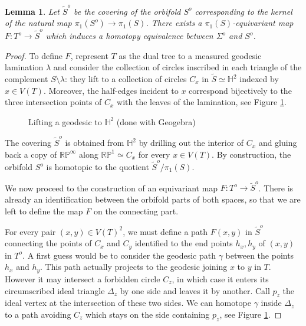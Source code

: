 \documentclass[10pt,a4paper]{amsart}
\newtheorem{lemma}{Lemma}
\renewcommand{\H}{\mathbb{H}}
\renewcommand{\P}{\mathbb{P}}
\newcommand{\R}{\mathbb{R}}
\begin{document}
\begin{lemma}\label{equiv-homotopy}
Let $\tilde{S}^o$ be the covering of the orbifold $S^o$ corresponding to the kernel of the natural map $\pi_1(S^o)\to \pi_1(S)$. There exists a $\pi_1(S)$-equivariant map $F:T^o\to \tilde{S}^o$ which induces a homotopy equivalence between $\Sigma^o$ and $S^o$.
\end{lemma}

\begin{proof}


To define $F$, represent $T$ as the dual tree to a measured geodesic lamination $\lambda$ and consider the collection of circles inscribed in each triangle of the complement $S\setminus\lambda$: they lift to a collection of circles $C_x$ in $\tilde{S}\simeq \H^2$ indexed by $x\in V(T)$.
%
Moreover, the half-edges incident to $x$ correspond bijectively to the three intersection points of $C_x$ with the leaves of the lamination, see Figure \ref{fig:equivmap}.

\begin{figure}[htbp]
    \centering
    
    \caption{Lifting a geodesic to $\H^2$ (done with Geogebra)}
    \label{fig:equivmap}
\end{figure}
%
%
The covering $\tilde{S}^o$ is obtained from $\H^2$ by drilling out the interior of $C_x$ and gluing back a copy of $\R\P^\infty$ along $\R\P^1\simeq C_x$ for every $x\in V(T)$. By construction, the orbifold $S^o$ is homotopic to the quotient $\tilde{S}^o/\pi_1(S)$. 

We now proceed to the construction of an equivariant map $F \colon T^o\to \tilde{S}^o$. There is already an identification between the orbifold parts of both spaces, so that we are left to define the map $F$ on the connecting part. 

For every pair $(x,y)\in V(T)^2$, we must define a path $F(x,y)$ in $\tilde{S}^o$ connecting the points of $C_x$ and $C_y$ identified to the end points $h_x,h_y$ of $(x,y)$ in $T^o$. A first guess would be to consider the geodesic path $\gamma$ between the points $h_x$ and $h_y$. This path actually projects to the geodesic joining $x$ to $y$ in $T$. However it may intersect a forbidden circle $C_z$, in which case it enters its circumscribed ideal triangle $\Delta_z$ by one side and leaves it by another. Call $p_z$ the ideal vertex at the intersection of these two sides. 
We can homotope $\gamma$ inside $\Delta_z$ to a path avoiding $C_z$ which stays on the side containing $p_z$, see Figure \ref{fig:equivmap}.


\end{proof}
\end{document}
